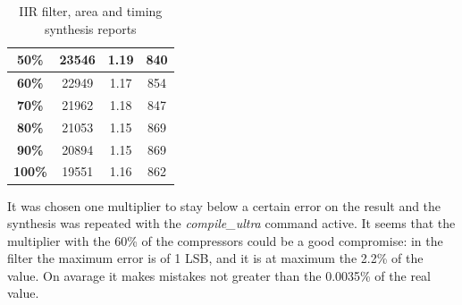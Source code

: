 \documentclass[a4paper]{article}
\begin{document}
\begin{table}[hbtp]
\begin{tabular}{|c|c|c|c|}
		\textbf{50\%}                                                                   & 		23546                                                                      & 		1.19                                                                       & 		840                                                                                  \\ \hline
		\textbf{60\%}                                                                   & 		22949                                                                      & 		1.17                                                                       & 		854                                                                                  \\ \hline
		\textbf{70\%}                                                                   & 		21962                                                                      & 		1.18                                                                       & 		847                                                                                  \\ \hline
		\textbf{80\%}                                                                   & 		21053                                                                      & 		1.15                                                                       & 		869                                                                                  \\ \hline
		\textbf{90\%}                                                                   & 		20894                                                                      & 		1.15                                                                       & 		869                                                                                  \\ \hline
		\textbf{100\%}                                                                  & 		19551                                                                      & 		1.16                                                                       & 		862                                                                                  \\ \hline
		\end{tabular}
		\caption{IIR filter, area and timing synthesis reports}
		\label{tab:iir_syn}
	\end{table}

	It was chosen one multiplier to stay below a certain error on the result and the synthesis was repeated with the \textit{compile\_ultra} command active. It seems that the multiplier with the 60\% of the compressors could be a good compromise: in the filter the maximum error is of 1 LSB, and it is at maximum the 2.2\% of the value. On avarage it makes mistakes not greater than the 0.0035\% of the real value.
\end{document}
